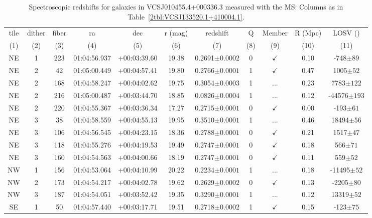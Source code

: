\begin{landscape}
	\begin{table}
		\centering 
		\caption[Spectroscopic redshifts for galaxies in VCSJ010455.4+000336.3]{Spectroscopic redshifts for galaxies in VCSJ010455.4+000336.3 measured with the MS: Columns as in Table~\ref{2tbl:VCSJ133520.1+410004.1}.}
		\begin{tabular}{ccccccccccc}
			\hline
			tile & dither & fiber & ra & dec & r (mag) & redshift & Q & Member & R (Mpc) & LOSV (\kms) \\
			(1) & (2) & (3) & (4) & (5) & (6) & (7) & (8) & (9) & (10) & (11) \\
			\hline \hline
			NE & 1 & 223 & 01:04:56.937 & +00:03:39.60 & 19.38 & 0.2691$\pm{0.0002}$ & 0 & $\checkmark$ & 0.10 & -748$\pm{89}$ \\
			NE & 2 & 42 & 01:05:00.449 & +00:04:57.41 & 19.80 & 0.2766$\pm{0.0001}$ & 1 & $\checkmark$ & 0.47 & 1005$\pm{52}$ \\
			NE & 2 & 168 & 01:04:58.247 & +00:04:02.62 & 19.75 & 0.3054$\pm{0.0003}$ & 1 & ... & 0.23 & 7783$\pm{122}$ \\
			NE & 2 & 216 & 01:05:00.487 & +00:03:44.70 & 18.85 & 0.0826$\pm{0.0004}$ & 1 & ... & 0.12 & -44576$\pm{193}$ \\
			NE & 2 & 220 & 01:04:55.367 & +00:03:36.34 & 17.27 & 0.2715$\pm{0.0001}$ & 0 & $\checkmark$ & 0.00 & -193$\pm{61}$ \\
			NE & 3 & 38 & 01:04:58.559 & +00:04:55.13 & 19.95 & 0.3510$\pm{0.0001}$ & 1 & ... & 0.46 & 18494$\pm{56}$ \\
			NE & 3 & 106 & 01:04:56.545 & +00:04:23.15 & 18.36 & 0.2788$\pm{0.0001}$ & 0 & $\checkmark$ & 0.21 & 1517$\pm{47}$ \\
			NE & 3 & 118 & 01:04:55.276 & +00:04:19.53 & 19.49 & 0.2747$\pm{0.0001}$ & 0 & $\checkmark$ & 0.18 & 566$\pm{71}$ \\
			NE & 3 & 160 & 01:04:54.563 & +00:04:00.66 & 18.19 & 0.2747$\pm{0.0001}$ & 0 & $\checkmark$ & 0.11 & 559$\pm{52}$ \\
			NW & 1 & 156 & 01:04:53.064 & +00:04:10.99 & 20.22 & 0.2234$\pm{0.0001}$ & 1 & ... & 0.18 & -11495$\pm{52}$ \\
			NW & 2 & 173 & 01:04:54.217 & +00:04:02.78 & 19.62 & 0.2629$\pm{0.0002}$ & 0 & $\checkmark$ & 0.13 & -2205$\pm{80}$ \\
			NW & 3 & 187 & 01:04:54.051 & +00:03:52.42 & 19.35 & 0.3290$\pm{0.0001}$ & 1 & ... & 0.12 & 13319$\pm{52}$ \\
			SE & 1 & 50 & 01:04:57.440 & +00:03:17.71 & 19.51 & 0.2718$\pm{0.0002}$ & 1 & $\checkmark$ & 0.15 & -123$\pm{75}$ \\

\end{tabular}
\end{table}
\end{landscape}
